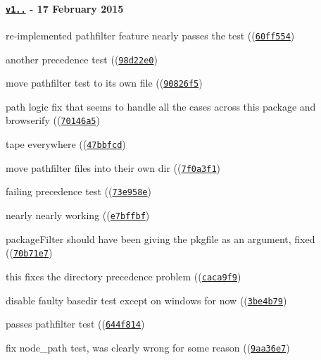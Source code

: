\paragraph*{\href{https://github.com/browserify/resolve/compare/v1.1.2...v1.1.3}{\tt v1..} -\/ 17 February 2015}


\begin{DoxyItemize}
\item re-\/implemented pathfilter feature nearly passes the test ((\href{https://github.com/browserify/resolve/commit/60ff5545ec3cd15367c89c08cf3f139fa9c23796}{\tt {\ttfamily 60ff554}})
\item another precedence test ((\href{https://github.com/browserify/resolve/commit/98d22e0e21dd57fe1ab8d9573c1f63903c2b7321}{\tt {\ttfamily 98d22e0}})
\item move pathfilter test to its own file ((\href{https://github.com/browserify/resolve/commit/90826f575fe37cb3852de17e764b62e3754484b2}{\tt {\ttfamily 90826f5}})
\item path logic fix that seems to handle all the cases across this package and browserify ((\href{https://github.com/browserify/resolve/commit/70146a5ebc4d96438383ada02785d4e722c6f5d9}{\tt {\ttfamily 70146a5}})
\item tape everywhere ((\href{https://github.com/browserify/resolve/commit/47bbfcd9d9c8a68ce97fa37e0563930cee67093d}{\tt {\ttfamily 47bbfcd}})
\item move pathfilter files into their own dir ((\href{https://github.com/browserify/resolve/commit/7f0a3f1545f4b53f1bdd099b67561f9516693325}{\tt {\ttfamily 7f0a3f1}})
\item failing precedence test ((\href{https://github.com/browserify/resolve/commit/73e958e905eed000787f0596f81c212ca2cdb3b3}{\tt {\ttfamily 73e958e}})
\item nearly nearly working ((\href{https://github.com/browserify/resolve/commit/e7bffbf1b39b6239732c0e7fb01eeb9dad605d15}{\tt {\ttfamily e7bffbf}})
\item package\+Filter should have been giving the pkgfile as an argument, fixed ((\href{https://github.com/browserify/resolve/commit/70b71e7980b3235018a0f5ac0bd52b8393548beb}{\tt {\ttfamily 70b71e7}})
\item this fixes the directory precedence problem ((\href{https://github.com/browserify/resolve/commit/caca9f9c3576c85d8972d25012ea5d12aeaa50f4}{\tt {\ttfamily caca9f9}})
\item disable faulty basedir test except on windows for now ((\href{https://github.com/browserify/resolve/commit/3be4b796f1a9aadfb293b36c0c7f781ca9169f09}{\tt {\ttfamily 3be4b79}})
\item passes pathfilter test ((\href{https://github.com/browserify/resolve/commit/644f81478c892874f9829aa6cca36ca72474db00}{\tt {\ttfamily 644f814}})
\item fix node\+\_\+path test, was clearly wrong for some reason ((\href{https://github.com/browserify/resolve/commit/9aa36e77eca50e177498984fdef5d564903d3964}{\tt {\ttfamily 9aa36e7}})
\end{DoxyItemize}

